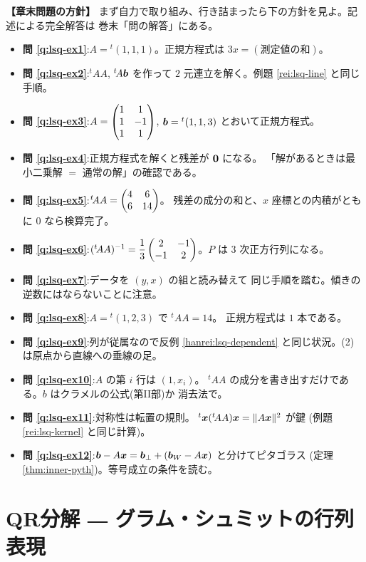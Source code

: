 \bigskip
{\small
\noindent\textbf{【章末問題の方針】}\quad
まず自力で取り組み、行き詰まったら下の方針を見よ。記述による完全解答は
巻末「問の解答」にある。
\begin{itemize}
\item \textbf{問 \ref{q:lsq-ex1}}:$A = {}^t(1, 1, 1)$。正規方程式は
$3x = (\text{測定値の和})$。
\item \textbf{問 \ref{q:lsq-ex2}}:${}^t\!AA$, ${}^t\!A\bm{b}$ を作って
$2$ 元連立を解く。例題 \ref{rei:lsq-line} と同じ手順。
\item \textbf{問 \ref{q:lsq-ex3}}:$A = \begin{pmatrix}1 & 1 \\ 1 & -1 \\ 1 & 1\end{pmatrix}$,
$\bm{b} = {}^t(1, 1, 3)$ とおいて正規方程式。
\item \textbf{問 \ref{q:lsq-ex4}}:正規方程式を解くと残差が $\bm{0}$ になる。
「解があるときは最小二乗解 $=$ 通常の解」の確認である。
\item \textbf{問 \ref{q:lsq-ex5}}:${}^t\!AA = \begin{pmatrix}4 & 6 \\ 6 & 14\end{pmatrix}$。
残差の成分の和と、$x$ 座標との内積がともに $0$ なら検算完了。
\item \textbf{問 \ref{q:lsq-ex6}}:$({}^t\!AA)^{-1} = \dfrac{1}{3}
\begin{pmatrix}2 & -1 \\ -1 & 2\end{pmatrix}$。$P$ は $3$ 次正方行列になる。
\item \textbf{問 \ref{q:lsq-ex7}}:データを $(y, x)$ の組と読み替えて
同じ手順を踏む。傾きの逆数にはならないことに注意。
\item \textbf{問 \ref{q:lsq-ex8}}:$A = {}^t(1, 2, 3)$ で ${}^t\!AA = 14$。
正規方程式は $1$ 本である。
\item \textbf{問 \ref{q:lsq-ex9}}:列が従属なので反例
\ref{hanrei:lsq-dependent} と同じ状況。(2) は原点から直線への垂線の足。
\item \textbf{問 \ref{q:lsq-ex10}}:$A$ の第 $i$ 行は $(1, x_i)$。
${}^t\!AA$ の成分を書き出すだけである。$b$ はクラメルの公式(第II部)か
消去法で。
\item \textbf{問 \ref{q:lsq-ex11}}:対称性は転置の規則。
${}^t\bm{x}({}^t\!AA)\bm{x} = \|A\bm{x}\|^2$ が鍵
(例題 \ref{rei:lsq-kernel} と同じ計算)。
\item \textbf{問 \ref{q:lsq-ex12}}:$\bm{b} - A\bm{x} =
\bm{b}_{\perp} + (\bm{b}_W - A\bm{x})$ と分けてピタゴラス
(定理 \ref{thm:inner-pyth})。等号成立の条件を読む。
\end{itemize}
}

\chapter{QR分解 ― グラム・シュミットの行列表現}\label{chap:qr}

